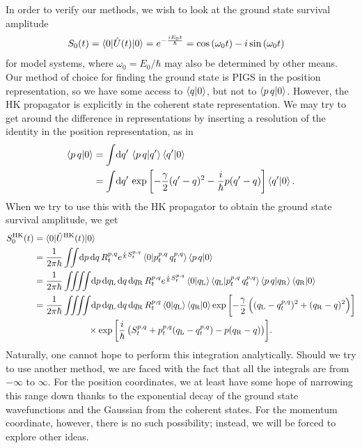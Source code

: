 In order to verify our methods, we wish to look at the ground state survival amplitude
\begin{align}
	S_0(t)
	&= \braket{0 | \hat{U}(t) | 0}
	= e^{-\frac{i E_0 t}{\hbar}}
	= \cos{(\omega_0 t)} - i \sin{(\omega_0 t)}
\end{align}
for model systems, where $\omega_0 = E_0 / \hbar$ may also be determined by other means.
Our method of choice for finding the ground state is PIGS in the position representation, so we have some access to $\braket{q | 0}$, but not to $\braket{p \, q | 0}$.
However, the HK propagator is explicitly in the coherent state representation.
We may try to get around the difference in representations by inserting a resolution of the identity in the position representation, as in
\begin{subequations}
\begin{align}
	\braket{p \, q | 0}
	&= \int\! \dif q' \, \braket{p \, q | q'} \braket{q' | 0} \\
	&= \int\! \dif q' \, \expb{-\frac{\gamma}{2} (q' - q)^2 - \frac{i}{\hbar} p (q' - q)} \braket{q' | 0}.
\end{align}
\end{subequations}
When we try to use this with the HK propagator to obtain the ground state survival amplitude, we get
\begin{subequations}
\begin{align}
	S_0\hk(t)
	&= \braket{0 | \hat{U}\hk(t) | 0} \\
	&= \frac{1}{2 \pi \hbar} \iint\! \dif p \dif q \,
			R\coh{p}{q}_t e^{\frac{i}{\hbar} S\coh{p}{q}_t}
			\braket{0 | p\coh{p}{q}_t \, q\coh{p}{q}_t} \braket{p \, q | 0} \\
	&= \frac{1}{2 \pi \hbar} \iiiint\! \dif p \dif q\LLup \dif q \dif q\RRup \,
			R\coh{p}{q}_t e^{\frac{i}{\hbar} S\coh{p}{q}_t}
			\braket{0 | q\LLup} \braket{q\LLup | p\coh{p}{q}_t \, q\coh{p}{q}_t}
			\braket{p \, q | q\RRup} \braket{q\RRup | 0} \\
	&= \frac{1}{2 \pi \hbar} \iiiint\! \dif p \dif q\LLup \dif q \dif q\RRup \,
			R\coh{p}{q}_t \braket{0 | q\LLup} \braket{q\RRup | 0}
			\expb{-\frac{\gamma}{2} \left( (q\LLup - q\coh{p}{q}_t)^2 + (q\RRup - q)^2 \right)} \notag \\
	&\qquad\qquad\qquad\times
			\expb{\frac{i}{\hbar} \left( S\coh{p}{q}_t + p\coh{p}{q}_t (q\LLup - q\coh{p}{q}_t) - p (q\RRup - q) \right)}.
				\label{eq:survival-hk}
\end{align}
\end{subequations}
Naturally, one cannot hope to perform this integration analytically.
Should we try to use another method, we are faced with the fact that all the integrals are from $-\infty$ to $\infty$.
For the position coordinates, we at least have some hope of narrowing this range down thanks to the exponential decay of the ground state wavefunctions and the Gaussian from the coherent states.
For the momentum coordinate, however, there is no such possibility; instead, we will be forced to explore other ideas.




